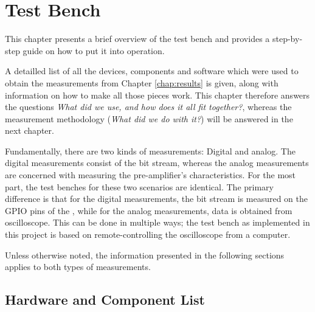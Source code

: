 \chapter{Test Bench}
\label{chap:testBench}

This  chapter presents a  brief overview  of the  test bench and  provides a
step-by-step  guide on how to  put it  into operation. 

A detailled list  of all the devices, components and  software which were used
to obtain  the measurements  from Chapter  \ref{chap:results} is  given, along
with information on how to make all those pieces work.  This chapter therefore
answers  the  questions  \emph{What did  we  use,  and  how  does it  all  fit
together?}, whereas  the measurement  methodology (\emph{What  did we  do with
it?}) will be answered in the next chapter.

Fundamentally,   there   are   two    kinds   of   measurements: Digital   and
analog. The  digital  measurements consist  of  the  bit stream,  whereas  the
analog  measurements   are  concerned   with  measuring   the  pre-amplifier's
characteristics. For the most  part, the test benches for  these two scenarios
are identical.  The  primary difference is that for  the digital measurements,
the bit  stream is  measured on  the GPIO pins  of the  \raspi, while  for the
analog measurements, data  is obtained from oscilloscope. This can  be done in
multiple  ways; the  test bench  as implemented  in this  project is  based on
remote-controlling the oscilloscope from a computer.

Unless otherwise  noted, the information  presented in the  following sections
applies to both types of measurements.

\section{Hardware and Component List}
\label{sec:hwList}

